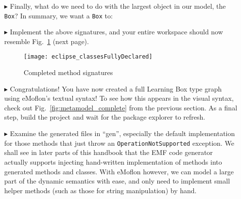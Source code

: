 \begin{itemize}
% 

\clearpage

\item[$\blacktriangleright$] Finally, what do we need to do with the largest object in our model, the \texttt{Box}? In summary, we want a \texttt{Box} to:


\item[$\blacktriangleright$] Implement the above signatures, and your entire workspace should now resemble Fig.~\ref{fig:workspaceMethods} ({\small next page}).


\begin{figure}[htbp]
	\centering
  \texttt{[image: eclipse\_classesFullyDeclared]}
	\caption{Completed method signatures}
	\label{fig:workspaceMethods}
\end{figure}

\item[$\blacktriangleright$] Congratulations! You have now created a full Learning Box type graph using eMoflon's textual syntax! To see how
this appears in the visual syntax, check out Fig.~\ref{fig:metamodel_complete} from the previous section. As a final step, build the project and wait for the
package explorer to refresh. 

\item[$\blacktriangleright$] Examine the generated files in ``gen'', especially the default implementation for those methods that just throw an
\texttt{OperationNotSupported} exception. We shall see in later parts of this handbook that the EMF code generator actually supports injecting hand-written
implementation of methods into generated methods and classes. With eMoflon however, we can model a large part of the dynamic semantics with ease, and only
need to implement small helper methods (such as those for string manipulation) by hand.


\end{itemize}